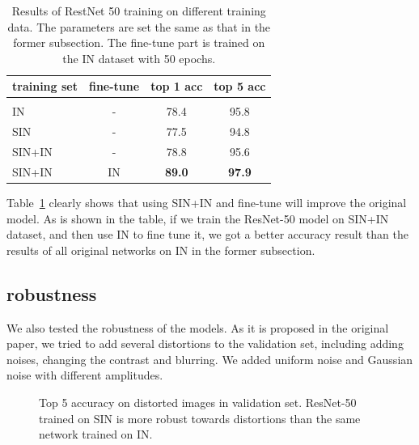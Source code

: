 \documentclass{article} %
\begin{document}
\begin{table}[!h]
\caption{Results of RestNet 50 training on different training data. The parameters are set the same as that in the former subsection. The fine-tune part is trained on the IN dataset with 50 epochs.}
\label{sample-table}
\begin{center}
\begin{tabular}{l c c c }
\bf training set & \bf fine-tune & \bf top 1 acc  & \bf top 5 acc
\\ \hline \\
IN   & - &78.4   &95.8 \\
SIN  & -   &77.5   &94.8 \\
SIN+IN   & -   &78.8   &95.6 \\
SIN+IN   & IN   & \bf 89.0   & \bf 97.9 \\
\end{tabular}
\label{improved}
\end{center}
\end{table}

Table~\ref{improved} clearly shows that using SIN+IN and fine-tune will improve the original model. As is shown in the table, if we train the ResNet-50 model on SIN+IN dataset, and then use IN to fine tune it, we got a better accuracy result than the results of all original networks on IN in the former subsection.


\subsection{robustness} 

We also tested the robustness of the models. As it is proposed in the original paper, we tried to add several distortions to the validation set, including adding noises, changing the contrast and blurring. We added uniform noise and Gaussian noise with different amplitudes. 

\begin{figure}[!h]
\caption{Top 5 accuracy on distorted images in validation set. ResNet-50 trained on SIN is more robust towards distortions than the same network trained on IN.}
\label{noise}
\end{figure}
\end{document}
